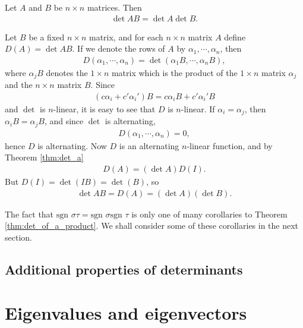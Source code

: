 \documentclass[12pt,letterpaper,reqno]{article}
\numberwithin{equation}{section}
\begin{document}
\begin{thm}\label{thm:det_of_a_product}
	Let $A$ and $B$ be $n \times n$ matrices. Then
	\begin{align*}
		\det AB= \det A \det B.
	\end{align*}
\end{thm}

\begin{pf}
	Let $B$ be a fixed $n \times n$ matrix, and for each $n \times n$ matrix $A$ define $D(A)=\det AB$. If we denote the rows of $A$ by $\alpha_1,\cdots,\alpha_n$, then
	\begin{align*}
		D(\alpha_1,\cdots,\alpha_n)=\det (\alpha_1 B, \cdots, \alpha_n B),
	\end{align*}	
where $\alpha_j B$ denotes the $1 \times n$ matrix which is the product of the $1 \times n$ matrix $\alpha_j$ and the $n \times n$ matrix $B$. Since 
\begin{align*}
	(c\alpha_i+c'\alpha_i')B=c\alpha_iB+c'\alpha_i'B
\end{align*}
and $\det$ is $n$-linear, it is easy to see that $D$ is $n$-linear. If $\alpha_i=\alpha_j$, then $\alpha_i B=\alpha_jB$, and since $\det$ is alternating,
\begin{align*}
	D(\alpha_1,\cdots,\alpha_n)=0,
\end{align*}
hence $D$ is alternating. Now $D$ is an alternating $n$-linear function, and by Theorem \ref{thm:det_a}
\begin{align*}
	D(A)=(\det A)D(I).
\end{align*}
But $D(I)=\det(IB)=\det(B)$, so
\begin{align*}
	\det AB=D(A)=(\det A)(\det B).
\end{align*}
\end{pf}

The fact that $\text{sgn }\sigma\tau=\text{sgn }\sigma \text{sgn }\tau$ is only one of many corollaries to Theorem \ref{thm:det_of_a_product}. We shall consider some of these corollaries in the next section.

\subsection{Additional properties of determinants}


\section{Eigenvalues and eigenvectors}

\printbibliography
\nocite{*}
\end{document}
